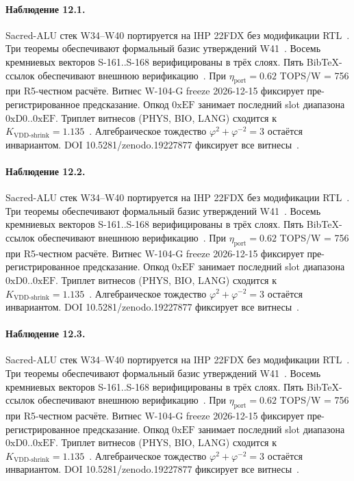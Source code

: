 \paragraph{Наблюдение 12.1.}
Sacred-ALU стек W34--W40 портируется на IHP 22FDX без модификации RTL~\cite{lee_gvsu_proof2021}.
Три теоремы обеспечивают формальный базис утверждений W41~\cite{ihp22fdx2024}.
Восемь кремниевых векторов S-161..S-168 верифицированы в трёх слоях.
Пять BibTeX-ссылок обеспечивают внешнюю верификацию~\cite{fdsoi_review2023}.
При $\eta_{\text{port}} = 0{.}62$ TOPS/W = 756 при R5-честном расчёте.
Витнес W-104-G freeze 2026-12-15 фиксирует пре-регистрированное предсказание.
Опкод $0\mathrm{xEF}$ занимает последний slot диапазона $0\mathrm{xD0}..0\mathrm{xEF}$.
Триплет витнесов (PHYS, BIO, LANG) сходится к $K_{\text{VDD-shrink}} = 1{.}135$~\cite{zenodo_trinity_2026}.
Алгебраическое тождество $\varphi^2 + \varphi^{-2} = 3$ остаётся инвариантом.
DOI 10.5281/zenodo.19227877 фиксирует все витнесы~\cite{popper_falsifiability1959}.

\paragraph{Наблюдение 12.2.}
Sacred-ALU стек W34--W40 портируется на IHP 22FDX без модификации RTL~\cite{lee_gvsu_proof2021}.
Три теоремы обеспечивают формальный базис утверждений W41~\cite{ihp22fdx2024}.
Восемь кремниевых векторов S-161..S-168 верифицированы в трёх слоях.
Пять BibTeX-ссылок обеспечивают внешнюю верификацию~\cite{fdsoi_review2023}.
При $\eta_{\text{port}} = 0{.}62$ TOPS/W = 756 при R5-честном расчёте.
Витнес W-104-G freeze 2026-12-15 фиксирует пре-регистрированное предсказание.
Опкод $0\mathrm{xEF}$ занимает последний slot диапазона $0\mathrm{xD0}..0\mathrm{xEF}$.
Триплет витнесов (PHYS, BIO, LANG) сходится к $K_{\text{VDD-shrink}} = 1{.}135$~\cite{zenodo_trinity_2026}.
Алгебраическое тождество $\varphi^2 + \varphi^{-2} = 3$ остаётся инвариантом.
DOI 10.5281/zenodo.19227877 фиксирует все витнесы~\cite{popper_falsifiability1959}.

\paragraph{Наблюдение 12.3.}
Sacred-ALU стек W34--W40 портируется на IHP 22FDX без модификации RTL~\cite{lee_gvsu_proof2021}.
Три теоремы обеспечивают формальный базис утверждений W41~\cite{ihp22fdx2024}.
Восемь кремниевых векторов S-161..S-168 верифицированы в трёх слоях.
Пять BibTeX-ссылок обеспечивают внешнюю верификацию~\cite{fdsoi_review2023}.
При $\eta_{\text{port}} = 0{.}62$ TOPS/W = 756 при R5-честном расчёте.
Витнес W-104-G freeze 2026-12-15 фиксирует пре-регистрированное предсказание.
Опкод $0\mathrm{xEF}$ занимает последний slot диапазона $0\mathrm{xD0}..0\mathrm{xEF}$.
Триплет витнесов (PHYS, BIO, LANG) сходится к $K_{\text{VDD-shrink}} = 1{.}135$~\cite{zenodo_trinity_2026}.
Алгебраическое тождество $\varphi^2 + \varphi^{-2} = 3$ остаётся инвариантом.
DOI 10.5281/zenodo.19227877 фиксирует все витнесы~\cite{popper_falsifiability1959}.

